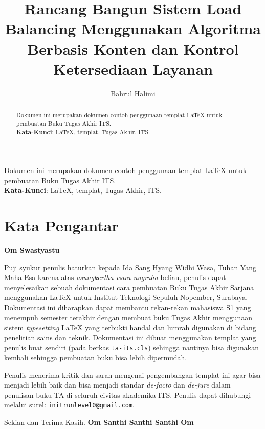 \documentclass{ta-its}
\title{Rancang Bangun Sistem Load Balancing Menggunakan Algoritma Berbasis Konten dan Kontrol Ketersediaan Layanan}{Design and Implementasion of Load Balancing System with Content-Based Algorithm and Availability Control}{KI1502}
\author{Bahrul Halimi}{5111100014}
\begin{document}
    \frontmatter %
    \maketitle
    \legalityPaper %
    \begin{abstrak}
    	Dokumen ini merupakan dokumen contoh penggunaan templat \LaTeX{} untuk pembuatan Buku Tugas Akhir ITS. \\
    	
    	\noindent \textbf{Kata-Kunci}: \LaTeX{}, templat, Tugas Akhir, ITS.
	\end{abstrak}
   \begin{abstract}
    	Dokumen ini merupakan dokumen contoh penggunaan templat \LaTeX{} untuk pembuatan Buku Tugas Akhir ITS. \\
    	
    	\noindent \textbf{Kata-Kunci}: \LaTeX{}, templat, Tugas Akhir, ITS.
	\end{abstract}
    \chapter{Kata Pengantar}
        \textbf{Om Swastyastu}

        Puji syukur penulis haturkan kepada Ida Sang Hyang Widhi Wasa, Tuhan Yang Maha Esa karena atas \emph{asungkertha wara nugraha} beliau, penulis dapat menyelesaikan sebuah dokumentasi cara pembuatan Buku Tugas Akhir Sarjana menggunakan \LaTeX{} untuk Institut Teknologi Sepuluh Nopember, Surabaya. Dokumentasi ini diharapkan dapat membantu rekan-rekan mahasiswa S1 yang menempuh semester terakhir dengan membuat buku Tugas Akhir menggunaan sistem \emph{typesetting} \LaTeX{} yang terbukti handal dan lumrah digunakan di bidang penelitian sains dan teknik. Dokumentasi ini dibuat menggunakan templat yang penulis buat sendiri (pada berkas \texttt{ta-its.cls}) sehingga nantinya bisa digunakan kembali sehingga pembuatan buku bisa lebih dipermudah.

        Penulis menerima kritik dan saran mengenai pengembangan templat ini agar bisa menjadi lebih baik dan bisa menjadi standar \emph{de-facto} dan \emph{de-jure} dalam penulisan buku TA di seluruh civitas akademika ITS. Penulis dapat dihubungi melalui surel: \texttt{initrunlevel0@gmail.com}.

        Sekian dan Terima Kasih.
        \noindent \textbf{Om Santhi Santhi Santhi Om}

        \cleardoublepage %
\end{document}

